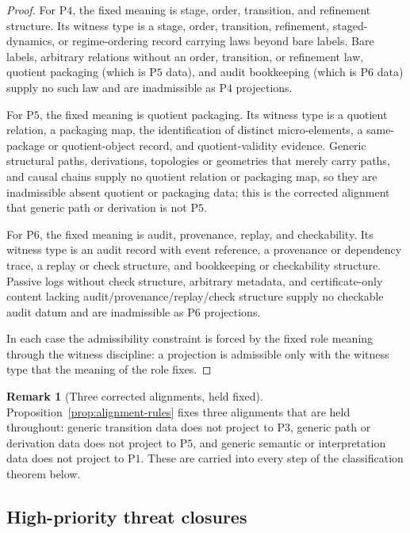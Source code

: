 \documentclass[11pt]{article}
\theoremstyle{definition}
\newtheorem{remark}[theorem]{Remark}
\newcommand{\Pone}{\ensuremath{\mathrm{P1}}}
\newcommand{\Pthree}{\ensuremath{\mathrm{P3}}}
\newcommand{\Pfour}{\ensuremath{\mathrm{P4}}}
\newcommand{\Pfive}{\ensuremath{\mathrm{P5}}}
\newcommand{\Psix}{\ensuremath{\mathrm{P6}}}
\begin{document}
\begin{proof}
For \Pfour{}, the fixed meaning is stage, order, transition, and
refinement structure. Its witness type is a stage, order, transition,
refinement, staged-dynamics, or regime-ordering record carrying laws
beyond bare labels. Bare labels, arbitrary relations without an order,
transition, or refinement law, quotient packaging (which is \Pfive{}
data), and audit bookkeeping (which is \Psix{} data) supply no such law
and are inadmissible as \Pfour{} projections.

For \Pfive{}, the fixed meaning is quotient packaging. Its witness type
is a quotient relation, a packaging map, the identification of distinct
micro-elements, a same-package or quotient-object record, and
quotient-validity evidence. Generic structural paths, derivations,
topologies or geometries that merely carry paths, and causal chains
supply no quotient relation or packaging map, so they are inadmissible
absent quotient or packaging data; this is the corrected alignment that
generic path or derivation is not \Pfive{}.

For \Psix{}, the fixed meaning is audit, provenance, replay, and
checkability. Its witness type is an audit record with event reference,
a provenance or dependency trace, a replay or check structure, and
bookkeeping or checkability structure. Passive logs without check
structure, arbitrary metadata, and certificate-only content lacking
audit/provenance/replay/check structure supply no checkable audit datum
and are inadmissible as \Psix{} projections.

In each case the admissibility constraint is forced by the fixed role
meaning through the witness discipline: a projection is admissible only
with the witness type that the meaning of the role fixes.
\end{proof}

\begin{remark}[Three corrected alignments, held fixed]\label{rem:three-repaired-alignments}
Proposition~\ref{prop:alignment-rules} fixes three alignments that
are held throughout: generic transition data does not project to
\Pthree{}, generic path or derivation data does not project to
\Pfive{}, and generic semantic or interpretation data does not project
to \Pone{}. These are carried into every step of the classification
theorem below.
\end{remark}

\subsection{High-priority threat closures}\label{subsec:threat-closures}
\end{document}
